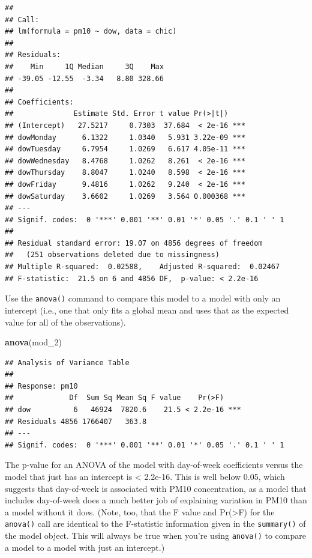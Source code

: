 \documentclass[]{book}
\makeatletter
\newenvironment{Shaded}{\begin{snugshade}}{\end{snugshade}}
\newcommand{\KeywordTok}[1]{\textcolor[rgb]{0.13,0.29,0.53}{\textbf{#1}}}
\newcommand{\DecValTok}[1]{\textcolor[rgb]{0.00,0.00,0.81}{#1}}
\newcommand{\NormalTok}[1]{#1}
\newenvironment{kframe}{%
\medskip{}
\setlength{\fboxsep}{.8em}
 \def\at@end@of@kframe{}%
 \ifinner\ifhmode%
  \def\at@end@of@kframe{\end{minipage}}%
  \begin{minipage}{\columnwidth}%
 \fi\fi%
 \def\FrameCommand##1{\hskip\@totalleftmargin \hskip-\fboxsep
 \colorbox{shadecolor}{##1}\hskip-\fboxsep
     \hskip-\linewidth \hskip-\@totalleftmargin \hskip\columnwidth}%
 \MakeFramed {\advance\hsize-\width
   \@totalleftmargin\z@ \linewidth\hsize
   \@setminipage}}%
 {\par\unskip\endMakeFramed%
 \at@end@of@kframe}
\renewenvironment{Shaded}{\begin{kframe}}{\end{kframe}}
\theoremstyle{definition}
\theoremstyle{definition}
\theoremstyle{definition}
\theoremstyle{remark}
\makeatother
\begin{document}
\begin{verbatim}
## 
## Call:
## lm(formula = pm10 ~ dow, data = chic)
## 
## Residuals:
##    Min     1Q Median     3Q    Max 
## -39.05 -12.55  -3.34   8.80 328.66 
## 
## Coefficients:
##              Estimate Std. Error t value Pr(>|t|)    
## (Intercept)   27.5217     0.7303  37.684  < 2e-16 ***
## dowMonday      6.1322     1.0340   5.931 3.22e-09 ***
## dowTuesday     6.7954     1.0269   6.617 4.05e-11 ***
## dowWednesday   8.4768     1.0262   8.261  < 2e-16 ***
## dowThursday    8.8047     1.0240   8.598  < 2e-16 ***
## dowFriday      9.4816     1.0262   9.240  < 2e-16 ***
## dowSaturday    3.6602     1.0269   3.564 0.000368 ***
## ---
## Signif. codes:  0 '***' 0.001 '**' 0.01 '*' 0.05 '.' 0.1 ' ' 1
## 
## Residual standard error: 19.07 on 4856 degrees of freedom
##   (251 observations deleted due to missingness)
## Multiple R-squared:  0.02588,    Adjusted R-squared:  0.02467 
## F-statistic:  21.5 on 6 and 4856 DF,  p-value: < 2.2e-16
\end{verbatim}

Use the \texttt{anova()} command to compare this model to a model with
only an intercept (i.e., one that only fits a global mean and uses that
as the expected value for all of the observations).

\begin{Shaded}
\begin{Highlighting}[]
\KeywordTok{anova}\NormalTok{(mod_}\DecValTok{2}\NormalTok{)}
\end{Highlighting}
\end{Shaded}

\begin{verbatim}
## Analysis of Variance Table
## 
## Response: pm10
##             Df  Sum Sq Mean Sq F value    Pr(>F)    
## dow          6   46924  7820.6    21.5 < 2.2e-16 ***
## Residuals 4856 1766407   363.8                      
## ---
## Signif. codes:  0 '***' 0.001 '**' 0.01 '*' 0.05 '.' 0.1 ' ' 1
\end{verbatim}

The p-value for an ANOVA of the model with day-of-week coefficients
versus the model that just has an intercept is \textless{} 2.2e-16. This
is well below 0.05, which suggests that day-of-week is associated with
PM10 concentration, as a model that includes day-of-week does a much
better job of explaining variation in PM10 than a model without it does.
(Note, too, that the F value and Pr(\textgreater{}F) for the
\texttt{anova()} call are identical to the F-statistic information given
in the \texttt{summary()} of the model object. This will always be true
when you're using \texttt{anova()} to compare a model to a model with
just an intercept.)
\end{document}
